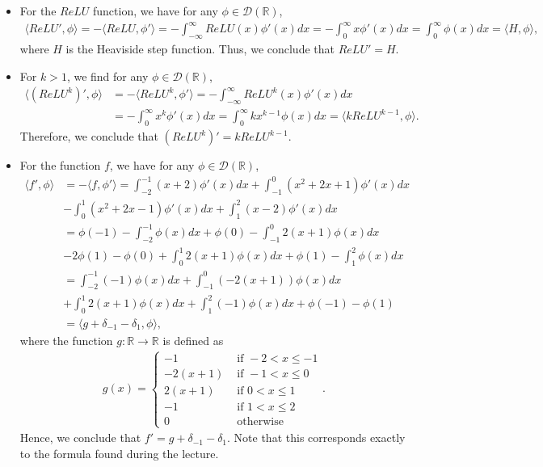 \documentclass[11pt]{article}
\begin{document}
\begin{solution}
    \begin{itemize}
        \item For the $ReLU$ function, we have for any $\phi \in \mathcal D(\mathbb{R})$,
        \begin{align*}
            \langle ReLU', \phi \rangle = -\langle ReLU, \phi' \rangle = -\int_{-\infty}^{\infty} ReLU(x) \phi'(x) dx = -\int_{0}^{\infty} x \phi'(x) dx = \int_{0}^{\infty} \phi(x) dx = \langle H, \phi \rangle,
        \end{align*}
        where $H$ is the Heaviside step function. Thus, we conclude that $ReLU' = H$.
        \item For $k > 1$, we find for any $\phi \in \mathcal D(\mathbb{R})$,
        \begin{align*}
            \langle (ReLU^k)', \phi \rangle &= - \langle ReLU^k, \phi' \rangle = - \int_{-\infty}^{\infty} ReLU^k(x) \phi'(x) dx \\
            &= - \int_{0}^{\infty} x^k \phi'(x) dx = \int_{0}^{\infty} k x^{k-1} \phi(x) dx = \langle k ReLU^{k-1}, \phi \rangle.
        \end{align*}
        Therefore, we conclude that $(ReLU^k)' = k ReLU^{k-1}$.
        \item For the function $f$, we have for any $\phi \in \mathcal D(\mathbb{R})$,
        \begin{align*}
            \langle f', \phi \rangle &= - \langle f, \phi'\rangle = \int_{-2}^{-1}(x + 2) \phi'(x) dx + \int_{-1}^{0} (x^2 + 2x + 1) \phi'(x) dx\\
            &- \int_{0}^{1} (x^2 + 2x - 1) \phi'(x) dx + \int_{1}^{2} (x - 2) \phi'(x) dx \\
            &= \phi(-1) - \int_{-2}^{-1} \phi(x) dx + \phi(0) - \int_{-1}^{0} 2(x + 1) \phi(x)dx\\
            &- 2\phi(1)  - \phi(0) + \int_{0}^{1} 2(x + 1) \phi(x) dx + \phi(1) - \int_{1}^{2} \phi(x) dx \\
            &= \int_{-2}^{-1} (-1) \phi(x) dx + \int_{-1}^0 (-2(x + 1)) \phi(x) dx \\
            &+ \int_{0}^{1} 2(x + 1) \phi(x) dx + \int_{1}^{2} (-1) \phi(x) dx + \phi(-1) - \phi(1)\\
            &= \langle g + \delta_{-1} - \delta_{1} , \phi \rangle,
        \end{align*}
        where the function $g: \mathbb{R} \to \mathbb{R}$ is defined as
        \begin{align*}
            g(x) = \begin{cases} -1 & \text{ if } -2 < x \leq -1 \\ -2(x + 1) & \text{ if } -1 < x \leq 0 \\ 2(x + 1) & \text{ if } 0 < x \leq 1 \\ -1 & \text{ if } 1 < x \leq 2 \\ 0 & \text{ otherwise } \end{cases}.
        \end{align*}
        Hence, we conclude that $f' = g + \delta_{-1} - \delta_{1}$. Note that this corresponds exactly to the formula found during the lecture.
    \end{itemize}
\end{solution}
\end{document}

